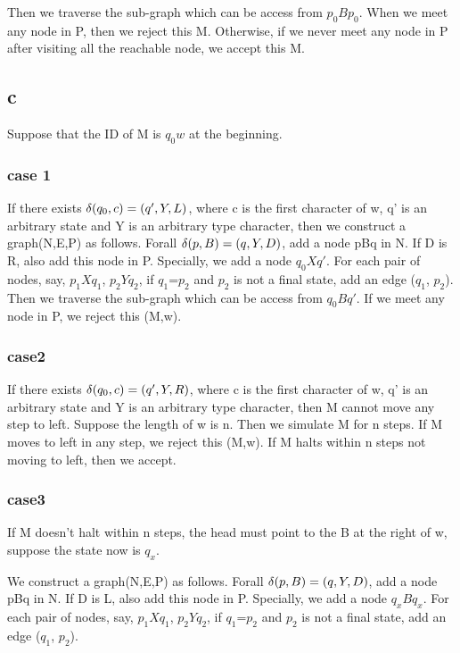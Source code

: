\documentclass[a4paper,UTF8]{ctexart}
\theoremstyle{definition}
\begin{document}
Then we traverse the sub-graph which can be access from $p_0Bp_0$. When we meet any node in P, then 
we reject this M. Otherwise, if we never meet any node in P after visiting all the reachable 
node, we accept this M.


\subsection*{c}
Suppose that the ID of M is $q_0w$ at the beginning.

\subsubsection*{case 1}
If there exists
$\delta(q_0,c)=(q',Y,L)$, where c is the first character of w, q' is an arbitrary
state and Y is an arbitrary type character, then we construct a graph(N,E,P) as follows.
Forall $\delta(p,B)=(q,Y,D)$, add a node pBq in N. If D is R, also add this node in P.
Specially, we add a node $q_0Xq'$.  For each pair of nodes, say, $p_1Xq_1$, $p_2Yq_2$, 
if $q_1$=$p_2$ and $p_2$ is not a final state, add an edge ($q_1$, $p_2$). \\

Then we traverse the sub-graph which can be access from $q_0Bq'$. If we meet any node in P,
we reject this (M,w).

\subsubsection*{case2}
If there exists $\delta(q_0,c)=(q',Y,R)$, where c is the first character of w, q' is an arbitrary
state and Y is an arbitrary type character, then M cannot move any step to left.
Suppose the length of w is n. Then we simulate M for n steps.  
If M moves to left in any step, we reject this (M,w).
If M halts within n steps not moving to left, then we accept.

\subsubsection*{case3}
If M doesn't halt within n steps, the head must point to the B at the right of w,
 suppose the state now is $q_x$.

We construct a graph(N,E,P) as follows.
Forall $\delta(p,B)=(q,Y,D)$, add a node pBq in N. If D is L, also add this node in P.
Specially, we add a node $q_xBq_x$.  For each pair of nodes, say, $p_1Xq_1$, $p_2Yq_2$, 
if $q_1$=$p_2$ and $p_2$ is not a final state, add an edge ($q_1$, $p_2$). \\
\end{document}
